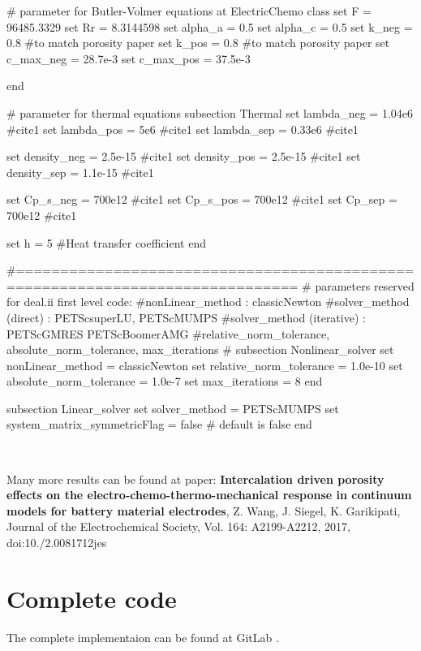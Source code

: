 \begin{DoxyCode}
# parameter \textcolor{keywordflow}{for} Butler-Volmer equations at ElectricChemo \textcolor{keyword}{class}
\textcolor{keyword}{set} F = 96485.3329
set Rr = 8.3144598
set alpha\_a = 0.5
set alpha\_c = 0.5
set k\_neg = 0.8 #to match porosity paper
\textcolor{keyword}{set} k\_pos = 0.8 #to match porosity paper
\textcolor{keyword}{set} c\_max\_neg = 28.7e-3
\textcolor{keyword}{set} c\_max\_pos = 37.5e-3

end

\textcolor{preprocessor}{# parameter for thermal equations}
subsection Thermal
\textcolor{keyword}{set} lambda\_neg = 1.04e6 #cite1
\textcolor{keyword}{set} lambda\_pos = 5e6  #cite1
\textcolor{keyword}{set} lambda\_sep = 0.33e6  #cite1


\textcolor{keyword}{set} density\_neg = 2.5e-15  #cite1
\textcolor{keyword}{set} density\_pos = 2.5e-15  #cite1
\textcolor{keyword}{set} density\_sep = 1.1e-15  #cite1


\textcolor{keyword}{set} Cp\_s\_neg = 700e12  #cite1
\textcolor{keyword}{set} Cp\_s\_pos = 700e12 #cite1
\textcolor{keyword}{set} Cp\_sep = 700e12  #cite1


\textcolor{keyword}{set} h = 5 #Heat transfer coefficient
end
            
                    
\textcolor{preprocessor}{#==============================================================================}
\textcolor{preprocessor}{# parameters reserved for deal.ii first level code:}
\textcolor{preprocessor}{#nonLinear\_method : classicNewton}
\textcolor{preprocessor}{#solver\_method (direct) : PETScsuperLU, PETScMUMPS}
\textcolor{preprocessor}{#solver\_method (iterative) : PETScGMRES PETScBoomerAMG}
\textcolor{preprocessor}{#relative\_norm\_tolerance, absolute\_norm\_tolerance, max\_iterations}
\textcolor{preprocessor}{#}
subsection Nonlinear\_solver
        \textcolor{keyword}{set} nonLinear\_method = classicNewton
        \textcolor{keyword}{set} relative\_norm\_tolerance = 1.0e-10
        \textcolor{keyword}{set} absolute\_norm\_tolerance = 1.0e-7
        \textcolor{keyword}{set} max\_iterations = 8
end
                        
subsection Linear\_solver
        \textcolor{keyword}{set} solver\_method = PETScMUMPS
        \textcolor{keyword}{set} system\_matrix\_symmetricFlag = \textcolor{keyword}{false} # \textcolor{keywordflow}{default} is \textcolor{keyword}{false}
end
\end{DoxyCode}


   ~\newline
 

Many more results can be found at paper\+: {\bfseries Intercalation driven porosity effects on the electro-\/chemo-\/thermo-\/mechanical response in continuum models for battery material electrodes}, Z. Wang, J. Siegel, K. Garikipati, Journal of the Electrochemical Society, Vol. 164\+: A2199-\/\+A2212, 2017, doi\+:10./2.0081712jes \hypertarget{_intercalation_com}{}\section{Complete code}\label{_intercalation_com}
The complete implementaion can be found at Git\+Lab . 